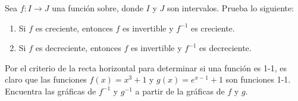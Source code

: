 \documentclass[12pt,a4paper]{book}
\begin{document}
    \begin{ejercicio}\label{ej:124}
        Sea $f:I\to J$ una función sobre, donde $I$ y $J$ son intervalos.
        Prueba lo siguiente:
        \begin{enumerate}[nosep]
            \item Si $f$ es creciente, entonces $f$ es invertible y $f^{-1}$ es creciente.
            \item Si $f$ es decreciente, entonces $f$ es invertible y $f^{-1}$ es decreciente.
        \end{enumerate}
    \end{ejercicio}

    \begin{ejercicio}\label{ej:125}
        Por el criterio de la recta horizontal para determinar si una
        función es 1-1, es claro que las funciones $f(x)=x^{3}+1$ y $g(x)=e^{x-1}+1$
        son funciones 1-1. Encuentra las gráficas de $f^{-1}$ y $g^{-1}$ a partir de la gráficas
        de $f$ y $g$.
    \end{ejercicio}
\end{document}

